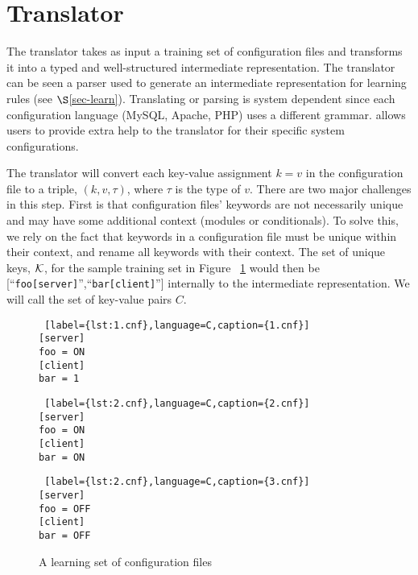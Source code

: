 
\section{Translator}
\label{sec-trans}

The translator takes as input a training set of configuration files and transforms it into a typed and well-structured intermediate representation.
The translator can be seen a parser used to generate an intermediate representation for learning rules (see $\S$\ref{sec-learn}).
Translating or parsing is system dependent since each configuration language (MySQL, Apache, PHP) uses a different grammar.
\app allows users to provide extra help to the translator for their specific system configurations.

The translator will convert each key-value assignment $k=v$ in the configuration file to a triple, $(k, v, \tau)$, where $\tau$ is the type of $v$. 
There are two major challenges in this step.
First is that configuration files' keywords are not necessarily unique and may have some additional context (modules or conditionals).
To solve this, we rely on the fact that keywords in a configuration file must be unique within their context, and rename all keywords with their context.
The set of unique keys, $\mathcal{K}$, for the sample training set in Figure ~\ref{fig:tset} would then be [``{\tt foo[server]}'',``{\tt bar[client]}''] internally to the intermediate representation.
We will call the set of key-value pairs $C$.


\begin{figure}[!htb]
    \centering
    \begin{minipage}{.25\textwidth}
	\begin{lstlisting} [label={lst:1.cnf},language=C,caption={1.cnf}]
[server]
foo = ON
[client]
bar = 1
	\end{lstlisting}
    \end{minipage}%
    \hspace{1cm}
    \begin{minipage}{0.25\textwidth}
	\begin{lstlisting} [label={lst:2.cnf},language=C,caption={2.cnf}]
[server]
foo = ON
[client]
bar = ON
	\end{lstlisting}
    \end{minipage}
    \hspace{1cm}
    \begin{minipage}{0.25\textwidth}
	\begin{lstlisting} [label={lst:2.cnf},language=C,caption={3.cnf}]
[server]
foo = OFF
[client]
bar = OFF
	\end{lstlisting}
    \end{minipage}
    \caption{A learning set of configuration files}
    \label{fig:tset}
\end{figure}



